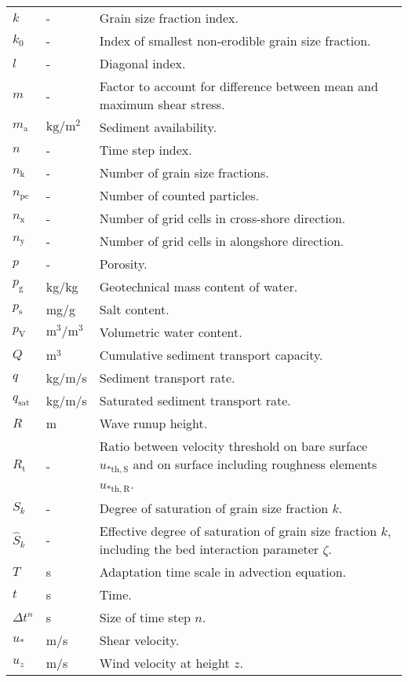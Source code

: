 \begin{longtable}{p{1cm} p{2cm} p{7.75cm}}
  $k$ & - & Grain size fraction index. \\
  $k_0$ & - & Index of smallest non-erodible grain size fraction. \\
  $l$ & - & Diagonal index. \\
  $m$ & - & Factor to account for difference between mean and maximum shear stress. \\
  $m_{\mathrm{a}}$ & $\mathrm{kg/m^2}$ & Sediment availability. \\
  $n$ & - & Time step index. \\
  $n_{\mathrm{k}}$ & - & Number of grain size fractions. \\
  $n_{\mathrm{pc}}$ & - & Number of counted particles. \\
  $n_{\mathrm{x}}$ & - & Number of grid cells in cross-shore direction. \\
  $n_{\mathrm{y}}$ & - & Number of grid cells in alongshore direction. \\
  $p$ & - & Porosity. \\
  $p_{\mathrm{g}}$ & kg/kg & Geotechnical mass content of water. \\
  $p_{\mathrm{s}}$ & mg/g & Salt content. \\
  $p_{\mathrm{V}}$ & $\mathrm{m^3/m^3}$ & Volumetric water content. \\
  $Q$ & $\mathrm{m^3}$ & Cumulative sediment transport capacity. \\
  $q$ & kg/m/s & Sediment transport rate. \\
  $q_{\mathrm{sat}}$ & kg/m/s & Saturated sediment transport rate. \\
  $R$ & m & Wave runup height. \\
  $R_{\mathrm{t}}$ & - & Ratio between velocity threshold on bare surface $u_{\mathrm{*th,S}}$ and on surface including roughness elements $u_{\mathrm{*th,R}}$. \\
  $S_k$ & - & Degree of saturation of grain size fraction $k$. \\
  $\hat{S}_k$ & - & Effective degree of saturation of grain size fraction $k$, including the bed interaction parameter $\zeta$. \\
  $T$ & s & Adaptation time scale in advection equation. \\
  $t$ & s & Time. \\
  $\Delta t^n$ & s & Size of time step $n$. \\
  $u_*$ & m/s & Shear velocity. \\
  $u_z$ & m/s & Wind velocity at height $z$. \\

\end{longtable}
